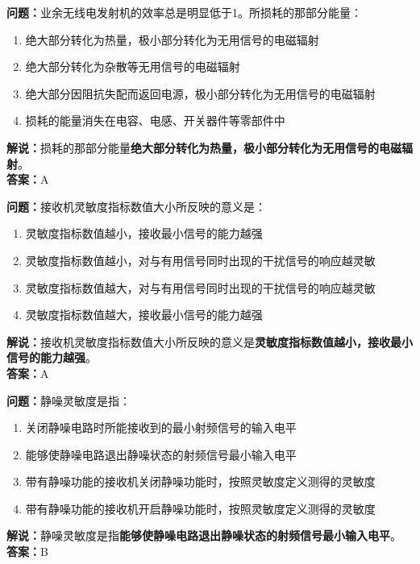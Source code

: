 \textbf{问题：}业余无线电发射机的效率总是明显低于1。所损耗的那部分能量：

\begin{enumerate}[label=\Alph*), leftmargin=1.5cm]
	\item 绝大部分转化为热量，极小部分转化为无用信号的电磁辐射
	\item 绝大部分转化为杂散等无用信号的电磁辐射
	\item 绝大部分因阻抗失配而返回电源，极小部分转化为无用信号的电磁辐射
	\item 损耗的能量消失在电容、电感、开关器件等零部件中
\end{enumerate}

\textbf{解说：}损耗的那部分能量\textbf{绝大部分转化为热量，极小部分转化为无用信号的电磁辐射}。\\\textbf{答案：}A%



\textbf{问题：}接收机灵敏度指标数值大小所反映的意义是：

\begin{enumerate}[label=\Alph*), leftmargin=1.5cm]
	\item 灵敏度指标数值越小，接收最小信号的能力越强
	\item 灵敏度指标数值越小，对与有用信号同时出现的干扰信号的响应越灵敏
	\item 灵敏度指标数值越大，对与有用信号同时出现的干扰信号的响应越灵敏
	\item 灵敏度指标数值越大，接收最小信号的能力越强
\end{enumerate}

\textbf{解说：}接收机灵敏度指标数值大小所反映的意义是\textbf{灵敏度指标数值越小，接收最小信号的能力越强}。\\\textbf{答案：}A%



\textbf{问题：}静噪灵敏度是指：

\begin{enumerate}[label=\Alph*), leftmargin=1.5cm]
	\item 关闭静噪电路时所能接收到的最小射频信号的输入电平
	\item 能够使静噪电路退出静噪状态的射频信号最小输入电平
	\item 带有静噪功能的接收机关闭静噪功能时，按照灵敏度定义测得的灵敏度
	\item 带有静噪功能的接收机开启静噪功能时，按照灵敏度定义测得的灵敏度
\end{enumerate}

\textbf{解说：}静噪灵敏度是指\textbf{能够使静噪电路退出静噪状态的射频信号最小输入电平}。\\\textbf{答案：}B%



